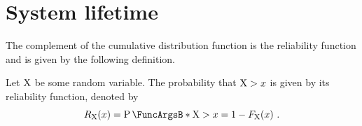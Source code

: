 \documentclass[
    11pt,
    extrafontsizes,
    article,
    oldfontcommands,
    final,
    oneside,
    openany,
    hidelinks]{memoir}
\begin{document}
\section{System lifetime}
The complement of the cumulative distribution function is the reliability 
function and is given by the following definition.
\begin{definition}
    \label{def:rel_function}
    Let $\mathrm{X}$ be some random variable. The probability that $\mathrm{X} > x$ is 
    given by its reliability function, denoted by
    \begin{equation}
    \label{eq:rel_function}
    \srv_{\RV{X}}\!\left(x\right) = \Prob{\RV{X} > x} = 1 - 
    \cdf_{\RV{X}}\!\left(x\right)\,.
    \end{equation}
\end{definition}
\end{document}
